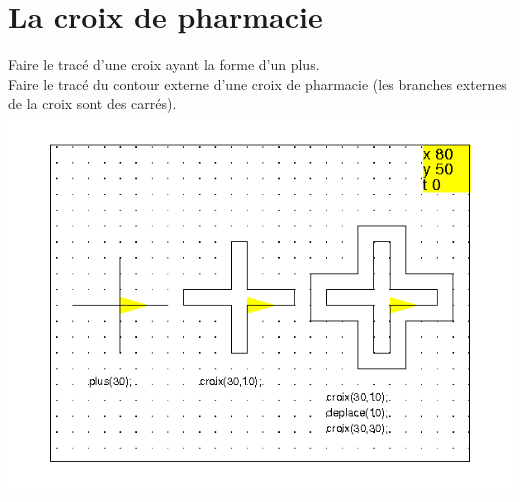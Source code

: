 \documentclass[a4paper,11pt]{book}
\begin{document}
\section{La croix de pharmacie}
Faire le trac\'e d'une croix ayant la forme d'un plus.\\
Faire le trac\'e du contour externe d'une croix de pharmacie (les branches 
externes de la croix sont des carr\'es).\\
\includegraphics[width=\textwidth]{tortcroix}
\end{document}
